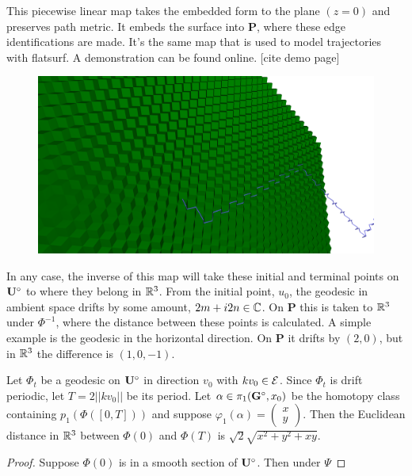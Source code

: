 \documentclass[a4paper, 11pt]{article}
\begin{document}
This piecewise linear map takes the embedded form to the plane $(z=0)$ and preserves path metric. It embeds the surface into $\mathbf{P}$, where these edge identifications are made. It's the same map that is used to model trajectories with flatsurf.\cite{flatsurf} A demonstration can be found online. [cite demo page] 
\begin{figure}[H]
\centering
\includegraphics[width=5in]{drift2.png}
\end{figure}

In any case, the inverse of this map will take these initial and terminal points on $\mathbf{U}^\circ$ to where they belong in $\mathbb{R}^3$. From the initial point, $u_0$, the geodesic in ambient space drifts by some amount, $2m+i2n\in\mathbb{C}$. On $\mathbf{P}$ this is taken to $\mathbb{R}^3$ under $\Phi^{-1}$, where the distance between these points is calculated. A simple example is the geodesic in the horizontal direction. On $\mathbf{P}$ it drifts by $(2,0)$, but in $\mathbb{R}^3$ the difference is $(1,0,-1)$.

\begin{cor}
Let $\Phi_t$ be a geodesic on $\mathbf{U}^\circ$ in direction $v_0$ with $kv_0\in\mathcal{E}$. Since $\Phi_t$ is drift periodic, let $T=2||kv_0||$ be its period. Let $\alpha\in\pi_1(\mathbf{G}^\circ,x_0)$ be the homotopy class containing $p_1(\Phi([0,T]))$ and suppose $\varphi_1(\alpha)=\begin{pmatrix}x\\y \end{pmatrix}$. Then the Euclidean distance in $\mathbb{R}^3$ between $\Phi(0)$ and $\Phi(T)$ is $\sqrt{2}\sqrt{x^2+y^2+xy}$.
\begin{proof}
Suppose $\Phi(0)$ is in a smooth section of $\mathbf{U}^\circ$. Then under $\Psi$
\end{proof}
\end{cor}
\end{document}
